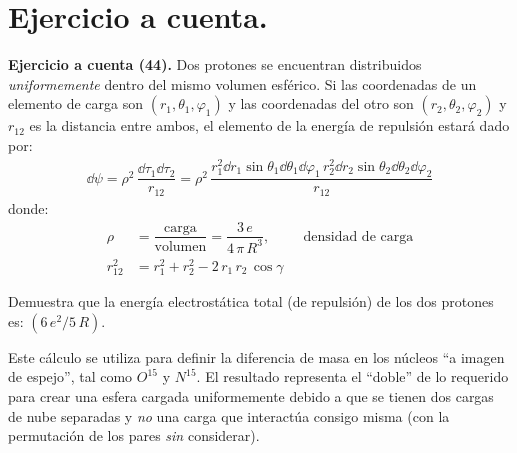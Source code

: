 \newpage
\section{Ejercicio a cuenta.}

\noindent
\textbf{Ejercicio a cuenta (44).} Dos protones se encuentran distribuidos \emph{uniformemente} dentro del mismo volumen esférico. Si las coordenadas de un elemento de carga son $(r_{1}, \theta_{1}, \varphi_{1})$ y las coordenadas del otro son $(r_{2}, \theta_{2}, \varphi_{2})$ y $r_{12}$ es la distancia entre ambos, el elemento de la energía de repulsión estará dado por:
\begin{align*}
\dd{\psi} = \rho^{2} \, \dfrac{\dd{\tau_{1}} \dd{\tau_{2}}}{r_{12}} = \rho^{2} \, \dfrac{r_{1}^{2} \dd{r_{1}} \sin \theta_{1} \dd{\theta_{1}} \dd{\varphi_{1}} \, r_{2}^{2} \dd{r_{2}} \sin \theta_{2} \dd{\theta_{2}} \dd{\varphi_{2}} }{r_{12}}
\end{align*}
donde:
\begin{align*}
\rho &= \dfrac{\mbox{carga}}{\mbox{volumen}} = \dfrac{3 \, e}{4 \, \pi \, R^{3}}, \hspace{1cm} \mbox{densidad de carga} \\[0.75em]
r_{12}^{2} &= r_{1}^{2} + r_{2}^{2} - 2 \, r_{1} \, r_{2} \, \cos \gamma
\end{align*}

Demuestra que la energía electrostática total (de repulsión) de los dos protones es: $(6 \, e^{2} / 5 \, R)$.
\par
Este cálculo se utiliza para definir la diferencia de masa en los núcleos \enquote{a imagen de espejo}, tal como $O^{15}$ y $N^{15}$. El resultado representa el \enquote{doble} de lo requerido para crear una esfera cargada uniformemente debido a que se tienen dos cargas de nube separadas y \emph{no} una carga que interactúa consigo misma (con la permutación de los pares \emph{sin} considerar).

